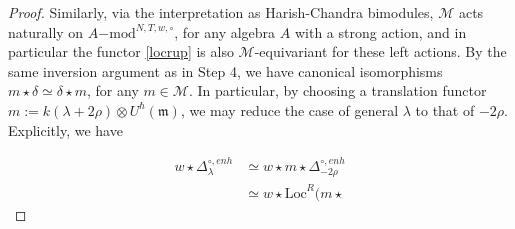 \documentclass{amsart}
\theoremstyle{definition}
\newcommand{\fm}{\mathfrak{m}}
\newcommand{\lmod}{\on{-mod}}
\newcommand{\sM}{\mathscr{M}}
\newcommand{\on}{\mathrm}
\numberwithin{equation}{section}
\begin{document}
\begin{proof}
Similarly, via the interpretation as Harish-Chandra bimodules, $\sM$ acts naturally on $A\lmod^{N,T, w, \circ}$, for any algebra $A$ with a strong action, and in particular the functor \eqref{locrup} is also $\sM$-equivariant for these left actions. By the same inversion argument as in Step 4, we have canonical isomorphisms $m \star \delta \simeq \delta \star m$, for any $m \in \sM$. In particular, by choosing a translation functor $m := k(\lambda + 2 \rho) \otimes U^\hbar(\fm)$, we may reduce the case of general $\lambda$ to that of $-2\rho$. Explicitly, we have 

\begin{align*} w \star \Delta^{\circ, enh}_{\lambda} &\simeq w \star m \star \Delta^{\circ, enh}_{-2\rho} \\ &\simeq w \star \on{Loc}^R(m \star   \end{align*}\fi 
\end{proof} 

\end{document}
